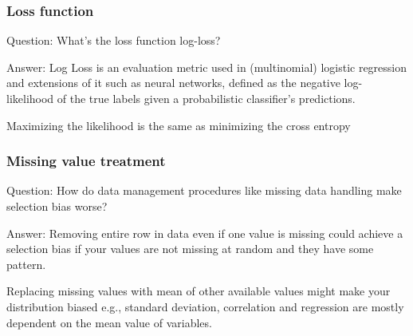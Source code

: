 \documentclass[11pt]{beamer}
\begin{document}
\begin{frame}
\frametitle{Loss function}
\begin{block}{Question:}
	What’s the loss function log-loss?
\end{block}
\begin{block}{Answer:}
	Log Loss is an evaluation metric used in (multinomial) logistic regression and extensions of it such as neural networks, defined as the negative log-likelihood of the true labels given a probabilistic classifier’s predictions.
	
	Maximizing the likelihood is the same as minimizing the cross entropy
\end{block}
\end{frame}

\begin{frame}
\frametitle{Missing value treatment}
\begin{block}{Question:}
	How do data management procedures like missing data handling make selection bias worse?
\end{block}
\begin{block}{Answer:}
	Removing entire row in data even if one value is missing could achieve a selection bias if your values are not missing at random and they have some pattern. 
	
	Replacing missing values with mean of other available values might make your distribution biased e.g., standard deviation, correlation and regression are mostly dependent on the mean value of variables.
\end{block}
\end{frame}
\end{document}
